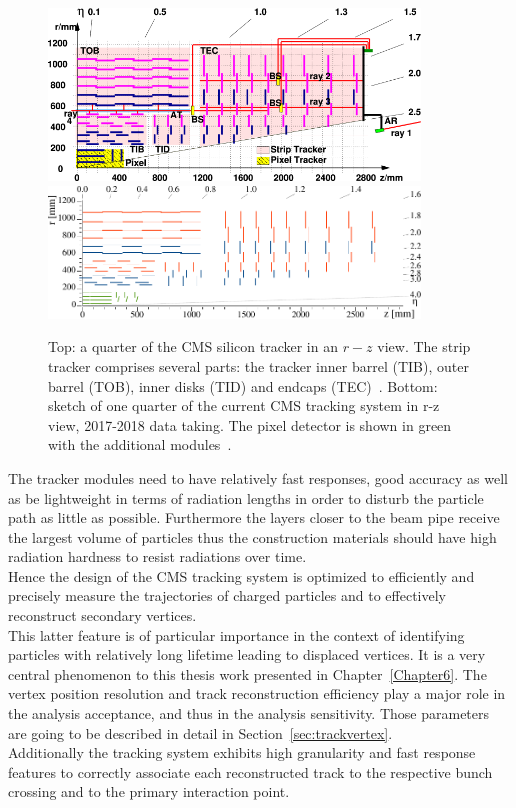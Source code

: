 \begin{figure}[h]
\centering
\includegraphics[width=0.88\textwidth]{Figures/c2/las}\\
\vspace{0.5cm}
\includegraphics[width=0.88\textwidth]{Figures/c2/Phase1_Tracker_1Quarter.pdf}
\vspace{0.5cm}

\caption{Top: a quarter of the CMS silicon tracker in an $r-z$
  view. The strip tracker comprises several parts: the tracker inner
  barrel (TIB), outer barrel (TOB), inner disks (TID) and endcaps
  (TEC)~\cite{Adam:1171503}. Bottom:
sketch of one quarter of the current CMS tracking system in
  r-z view, 2017-2018 data taking. The pixel detector is shown in
  green with the additional modules~\cite{trackingPU}.}
\label{fig:tracker}
\end{figure} 

The tracker modules need to have relatively fast responses, good
accuracy as well as be lightweight in terms of radiation lengths in
order to disturb the particle path as little as possible. Furthermore
the layers closer to the beam pipe receive
the largest volume of particles thus the construction materials should
have high radiation hardness to resist radiations over time.\\
Hence the design of the CMS tracking system is optimized to
efficiently and precisely measure the trajectories of charged
particles and to effectively reconstruct secondary vertices.\\
This latter feature is of particular
importance in the context of identifying particles with relatively
long lifetime leading to displaced vertices. It is a very central phenomenon
to this thesis work presented in Chapter~\ref{Chapter6}. The vertex position resolution and track
reconstruction efficiency play a major role in the analysis acceptance,
and thus in the analysis sensitivity. Those parameters are going to be
described in detail in Section~\ref{sec:trackvertex}.\\
Additionally the tracking system exhibits high granularity and
fast response features to correctly associate each reconstructed track
to the respective bunch crossing and to the primary interaction point.


